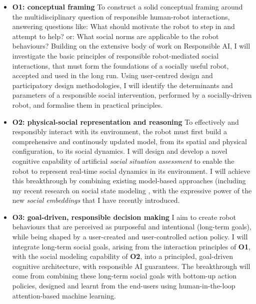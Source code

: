 \begin{itemize}
    \item \textbf{O1: conceptual framing} To construct a solid conceptual
        framing around the multidisciplinary question of responsible human-robot
        interactions, answering questions like: What should motivate the robot
        to step in and attempt to help? or: What social norms are applicable to
        the robot behaviours? Building on the extensive body of work on
        Responsible AI, I will investigate the basic principles of
        responsible robot-mediated social interactions, that must form the
        foundations of a socially useful robot, accepted and used in the long
        run.  Using user-centred design and participatory design methodologies,
        I will identify the determinants and parameters of a responsible social
        intervention, performed by a socially-driven robot, and formalise them
        in practical principles.

    \item \textbf{O2: physical-social representation and reasoning} To
        effectively and responsibly interact with its environment, the robot
        must first build a comprehensive and continously updated model, from its
        spatial and physical configuration, to its social dynamics. I will
        design and develop a novel cognitive capability of artificial
        \emph{social situation assessment} to enable the robot to represent
        real-time social dynamics in its environment. I will achieve this
        breakthrough by combining existing model-based approaches 
        (including my recent research on social state modeling , with
        the expressive power of the new \emph{social embeddings} that I have
        recently introduced.

    \item {\bf O3: goal-driven, responsible decision making} I aim to create
        robot behaviours that are perceived as purposeful and intentional
        (long-term goals), while being shaped by a user-created and
        user-controlled action policy.  I will integrate long-term social goals,
        arising from the interaction principles of \textbf{O1}, with the social
        modeling capability of \textbf{O2}, into a principled, goal-driven
        cognitive architecture, with responsible AI guarantees. The breakthrough
        will come from combining these long-term social goals with bottom-up
        action policies, designed and learnt from the end-users using
        human-in-the-loop attention-based machine learning.


\end{itemize}

